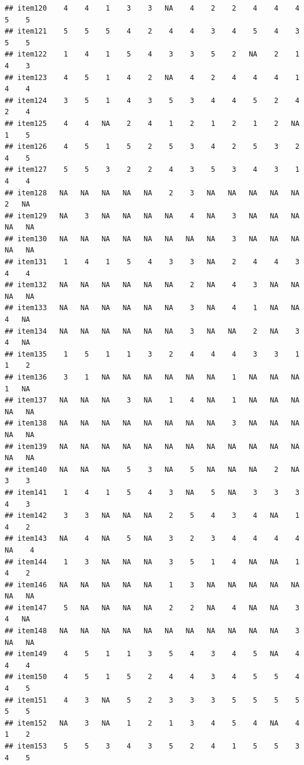 \documentclass[
  man]{apa6}
\begin{document}
\begin{verbatim}
## item120    4    4    1    3    3   NA    4    2    2    4    4    4    5    5
## item121    5    5    5    4    2    4    4    3    4    5    4    3    5    5
## item122    1    4    1    5    4    3    3    5    2   NA    2    1    4    3
## item123    4    5    1    4    2   NA    4    2    4    4    4    1    4    4
## item124    3    5    1    4    3    5    3    4    4    5    2    4    2    4
## item125    4    4   NA    2    4    1    2    1    2    1    2   NA    1    5
## item126    4    5    1    5    2    5    3    4    2    5    3    2    4    5
## item127    5    5    3    2    2    4    3    5    3    4    3    1    4    4
## item128   NA   NA   NA   NA   NA    2    3   NA   NA   NA   NA   NA    2   NA
## item129   NA    3   NA   NA   NA   NA    4   NA    3   NA   NA   NA   NA   NA
## item130   NA   NA   NA   NA   NA   NA   NA   NA    3   NA   NA   NA   NA   NA
## item131    1    4    1    5    4    3    3   NA    2    4    4    3    4    4
## item132   NA   NA   NA   NA   NA   NA    2   NA    4    3   NA   NA   NA   NA
## item133   NA   NA   NA   NA   NA   NA    3   NA    4    1   NA   NA    4   NA
## item134   NA   NA   NA   NA   NA   NA    3   NA   NA    2   NA    3    4   NA
## item135    1    5    1    1    3    2    4    4    4    3    3    1    1    2
## item136    3    1   NA   NA   NA   NA   NA   NA    1   NA   NA   NA    1   NA
## item137   NA   NA   NA    3   NA    1    4   NA    1   NA   NA   NA   NA   NA
## item138   NA   NA   NA   NA   NA   NA   NA   NA    3   NA   NA   NA   NA   NA
## item139   NA   NA   NA   NA   NA   NA   NA   NA   NA   NA   NA   NA   NA   NA
## item140   NA   NA   NA    5    3   NA    5   NA   NA   NA    2   NA    3    3
## item141    1    4    1    5    4    3   NA    5   NA    3    3    3    4    3
## item142    3    3   NA   NA   NA    2    5    4    3    4   NA    1    4    2
## item143   NA    4   NA    5   NA    3    2    3    4    4    4    4   NA    4
## item144    1    3   NA   NA   NA    3    5    1    4   NA   NA    1    4    2
## item146   NA   NA   NA   NA   NA    1    3   NA   NA   NA   NA   NA   NA   NA
## item147    5   NA   NA   NA   NA    2    2   NA    4   NA   NA    3    4   NA
## item148   NA   NA   NA   NA   NA   NA   NA   NA   NA   NA   NA    3   NA   NA
## item149    4    5    1    1    3    5    4    3    4    5   NA    4    4    4
## item150    4    5    1    5    2    4    4    3    4    5    5    4    4    5
## item151    4    3   NA    5    2    3    3    3    5    5    5    5    5    5
## item152   NA    3   NA    1    2    1    3    4    5    4   NA    4    1    2
## item153    5    5    3    4    3    5    2    4    1    5    5    3    4    5

\end{verbatim}
\end{document}
